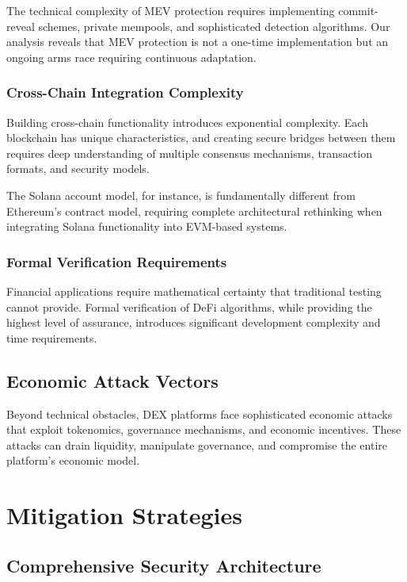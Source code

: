 \documentclass[11pt,a4paper]{article}
\begin{document}
The technical complexity of MEV protection requires implementing commit-reveal schemes, private mempools, and sophisticated detection algorithms. Our analysis reveals that MEV protection is not a one-time implementation but an ongoing arms race requiring continuous adaptation.

\subsubsection{Cross-Chain Integration Complexity}

Building cross-chain functionality introduces exponential complexity. Each blockchain has unique characteristics, and creating secure bridges between them requires deep understanding of multiple consensus mechanisms, transaction formats, and security models.

The Solana account model, for instance, is fundamentally different from Ethereum's contract model, requiring complete architectural rethinking when integrating Solana functionality into EVM-based systems.

\subsubsection{Formal Verification Requirements}

Financial applications require mathematical certainty that traditional testing cannot provide. Formal verification of DeFi algorithms, while providing the highest level of assurance, introduces significant development complexity and time requirements.

\subsection{Economic Attack Vectors}

Beyond technical obstacles, DEX platforms face sophisticated economic attacks that exploit tokenomics, governance mechanisms, and economic incentives. These attacks can drain liquidity, manipulate governance, and compromise the entire platform's economic model.

\section{Mitigation Strategies}

\subsection{Comprehensive Security Architecture}
\end{document}
